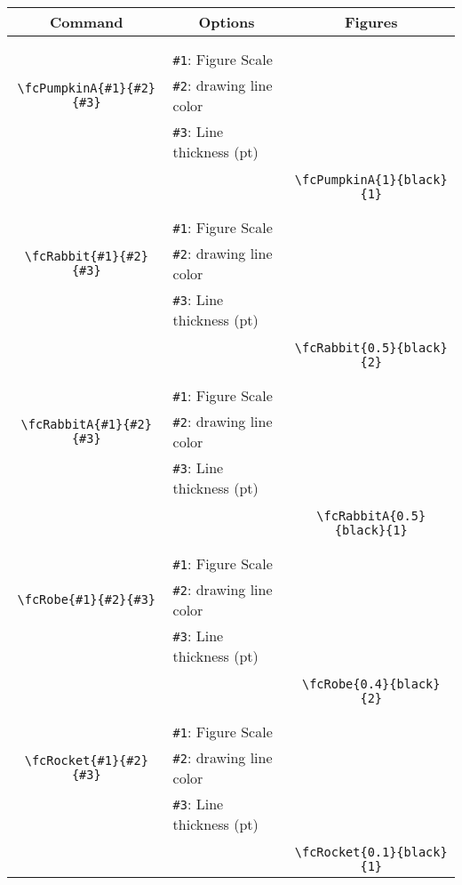 \documentclass{article}
\begin{document}
\begin{table}[H]\centering\begin{tabular}{|c|l|c|}\hline {\bf Command}& \multicolumn{1}{c|}{{\bf Options}} & {\bf Figures}\\  \hline	&&\multirow{5}{*}{\fcPumpkinA{1}{black}{1}}\\	&&\\	&\verb|#1|: Figure Scale &\\	\verb|\fcPumpkinA{#1}{#2}{#3}|&	\verb|#2|: drawing line color &\\	&\verb|#3|: Line thickness (pt) &\\ &&\\&&	\verb|\fcPumpkinA{1}{black}{1}|\\\hline 	
	&&\multirow{5}{*}{\fcRabbit{0.5}{black}{2}}\\	&&\\	&\verb|#1|: Figure Scale &\\	\verb|\fcRabbit{#1}{#2}{#3}|&	\verb|#2|: drawing line color &\\	&\verb|#3|: Line thickness (pt) &\\ &&\\&&	\verb|\fcRabbit{0.5}{black}{2}|\\\hline 	
	&&\multirow{5}{*}{\fcRabbitA{0.5}{black}{1}}\\	&&\\	&\verb|#1|: Figure Scale &\\	\verb|\fcRabbitA{#1}{#2}{#3}|&	\verb|#2|: drawing line color &\\	&\verb|#3|: Line thickness (pt) &\\ &&\\&&	\verb|\fcRabbitA{0.5}{black}{1}|\\\hline 	
	&&\multirow{5}{*}{\fcRobe{0.4}{black}{2}}\\	&&\\	&\verb|#1|: Figure Scale &\\	\verb|\fcRobe{#1}{#2}{#3}|&	\verb|#2|: drawing line color &\\	&\verb|#3|: Line thickness (pt) &\\ &&\\&&	\verb|\fcRobe{0.4}{black}{2}|\\\hline 	
	&&\multirow{5}{*}{\fcRocket{0.1}{black}{1}}\\	&&\\	&\verb|#1|: Figure Scale &\\	\verb|\fcRocket{#1}{#2}{#3}|&	\verb|#2|: drawing line color &\\	&\verb|#3|: Line thickness (pt) &\\ &&\\&&	\verb|\fcRocket{0.1}{black}{1}|\\\hline 	

\end{tabular}
\end{table}
\end{document}
